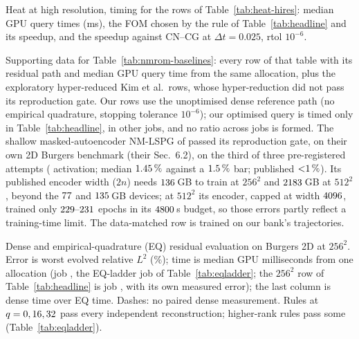 \begin{table}[htbp]
\centering
\caption{Heat at high resolution, timing for the rows of
Table~\ref{tab:heat-hires}: median GPU query times (ms), the FOM chosen
by the rule of Table~\ref{tab:headline} and its speedup, and the speedup
against CN--CG at $\Delta t=0.025$, rtol $10^{-6}$.}
\label{tab:heat-hires-times}
\resizebox{\linewidth}{!}{}
\end{table}

\begin{table}[htbp]
\centering
\caption{Supporting data for Table~\ref{tab:nmrom-baselines}: every row
of that table with its residual path and median GPU query time from the
same allocation, plus the exploratory hyper-reduced Kim et al.\ rows,
whose hyper-reduction did not pass its reproduction gate. Our rows use
the unoptimised dense reference path (no empirical quadrature, stopping
tolerance $10^{-6}$); our optimised query is timed only
in Table~\ref{tab:headline}, in other jobs, and no ratio across jobs is
formed. The shallow masked-autoencoder NM-LSPG of \citet{KimChoi2022NMROM}
passed its reproduction gate, on their own 2D Burgers benchmark (their
Sec.~6.2), on the third of three pre-registered attempts
(\nBaseGateAct{} activation; median $\nBaseGateMedian\,\%$ against a
$\nBaseGateBar\,\%$ bar; published ${<}\nBaseGatePublished\,\%$). Its
published encoder width ($2n$) needs $\nBaseEncoderNeedGB$\,GB to train at
$256^2$ and $\nBaseEncoderNeedGBFiveTwelve$\,GB at $512^2$, beyond the
$\nBaseDeviceGB$ and $\nBaseDeviceGBFiveTwelve$\,GB devices; at $512^2$
its encoder, capped at width $\nBaseKimWidth$, trained only
$\nBaseKimEpochs$ epochs in its $\nBaseKimWall$\,s budget, so those errors
partly reflect a training-time limit. The data-matched row is trained on our
bank's \nBaseDataMatched{} trajectories.}
\label{tab:nmrom-baselines-appx}
\resizebox{\linewidth}{!}{}
\end{table}

\begin{table}[htbp]
\centering
\caption{Dense and empirical-quadrature (EQ) residual evaluation on
Burgers 2D at $256^2$. Error is worst evolved relative $L^2$ (\%); time is
median GPU milliseconds from one allocation (job \provEqtopLadderJob, the
EQ-ladder job of Table~\ref{tab:eqladder}; the $256^2$ row of
Table~\ref{tab:headline} is job \provPanelJob{}, with its own measured error); the last column is dense
time over EQ time. Dashes: no paired dense measurement. Rules at
$q=\nEqtopConfirmedRungs$ pass every independent reconstruction;
higher-rank rules pass some (Table~\ref{tab:eqladder}).}
\label{tab:figure1-table}

\end{table}

